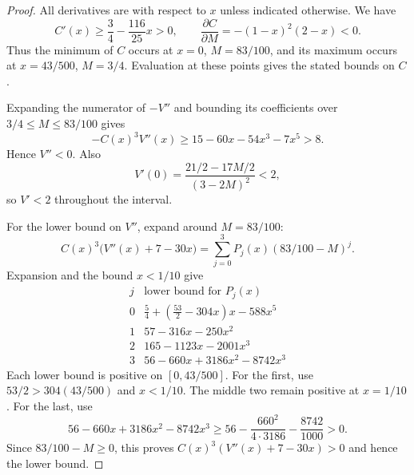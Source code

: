 \documentclass[11pt,letterpaper]{amsart}
\newcommand{\1}{\mathbf 1}
\numberwithin{equation}{section}
\begin{document}
\begin{proof}
All derivatives are with respect to $x$ unless indicated otherwise.
We have
\[
 C'(x)\ge\frac34-\frac{116}{25}x>0,\qquad
 \frac{\partial C}{\partial M}=-(1-x)^2(2-x)<0.
\]
Thus the minimum of $C$ occurs at $x=0$, $M=83/100$,
and its maximum occurs at $x=43/500$, $M=3/4$.
Evaluation at these points gives the stated bounds on $C$.

Expanding the numerator of $-V''$ and bounding its coefficients
over $3/4\le M\le83/100$ gives
\[
 -C(x)^3V''(x)\ge15-60x-54x^3-7x^5>8.
\]
Hence $V''<0$.
Also
\[
 V'(0)=\frac{21/2-17M/2}{(3-2M)^2}<2,
\]
so $V'<2$ throughout the interval.

For the lower bound on $V''$, expand around $M=83/100$:
\[
 C(x)^3\bigl(V''(x)+7-30x\bigr)
 =\sum_{j=0}^3P_j(x)(83/100-M)^j.
\]
Expansion and the bound $x<1/10$ give
\[
 \begin{array}{c|l}
 j&\text{lower bound for }P_j(x)\\ \hline
 0&\frac54+\left(\frac{53}{2}-304x\right)x-588x^5\\
 1&57-316x-250x^2\\
 2&165-1123x-2001x^3\\
 3&56-660x+3186x^2-8742x^3
 \end{array}
\]
Each lower bound is positive on $[0,43/500]$.
For the first, use $53/2>304(43/500)$ and $x<1/10$.
The middle two remain positive at $x=1/10$.
For the last, use
\[
 56-660x+3186x^2-8742x^3
 \ge56-\frac{660^2}{4\cdot3186}-\frac{8742}{1000}>0.
\]
Since $83/100-M\ge0$, this proves
$C(x)^3(V''(x)+7-30x)>0$ and hence the lower bound.
\end{proof}
\end{document}
